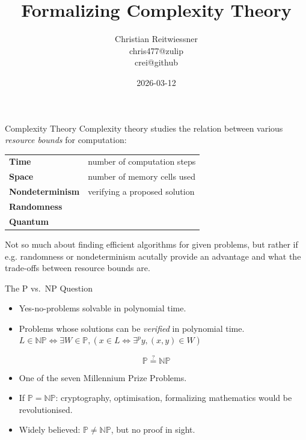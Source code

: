 \documentclass{beamer}
\title{Formalizing Complexity Theory}
\author{Christian Reitwiessner\\\vspace{1em}\tiny{chris477@zulip\\crei@github}}
\institute{leaning in 2026, Berlin}
\date{2026-03-12}
\begin{document}
\begin{frame}
  \titlepage
\end{frame}

\begin{frame}{Complexity Theory}
  Complexity theory studies the relation between various \emph{resource bounds} for computation:

  \medskip
  \begin{tabular}{ll}
    \textbf{Time}        & number of computation steps \\
    \textbf{Space}       & number of memory cells used \\
    \textbf{Nondeterminism} & verifying a proposed solution \\
    \textbf{Randomness} \\
    \textbf{Quantum} \\
  \end{tabular}

  \medskip

  Not so much about finding efficient algorithms for given problems,
  but rather if e.g. randomness or nondeterminism acutally provide an advantage
  and what the trade-offs between resource bounds are.
\end{frame}

\begin{frame}{The P vs.\ NP Question}
  \begin{itemize}
    \item[$\mathbb{P}$]   Yes-no-problems solvable in polynomial time.
    \item[$\mathbb{NP}$]  Problems whose solutions can be \emph{verified} in polynomial time.
      $L \in \mathbb{NP} \iff \exists W \in \mathbb{P}, (x \in L \iff \exists^{p} y, (x, y) \in W)$
  \end{itemize}

  \[
    \mathbb{P} \stackrel{?}{=} \mathbb{NP}
  \]

  \begin{itemize}
    \item One of the seven Millennium Prize Problems.
    \item If $\mathbb{P} = \mathbb{NP}$: cryptography, optimisation, formalizing mathematics would be revolutionised.
    \item Widely believed: $\mathbb{P} \neq \mathbb{NP}$, but no proof in sight.
  \end{itemize}
\end{frame}
\end{document}
